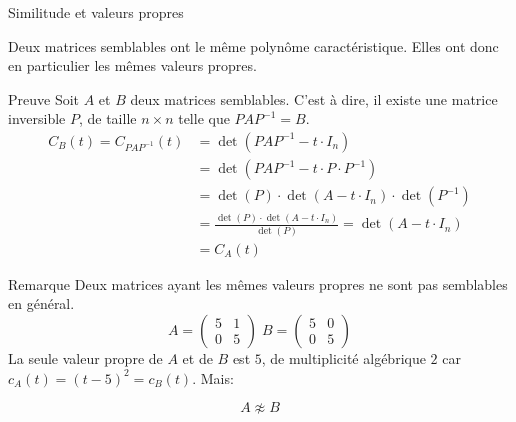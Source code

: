 \begin{parag}{Similitude et valeurs propres}
    \begin{theoreme}
        Deux matrices semblables ont le même polynôme caractéristique. Elles ont donc en particulier les mêmes valeurs propres.
    \end{theoreme}
    \begin{subparag}{Preuve}
        Soit $A$ et $B$ deux matrices semblables. C'est à dire, il existe une matrice inversible $P$, de taille $n \times n$ telle que $PAP^{-1} = B$.\\
        \begin{align*}
            C_B(t) = C_{PAP^{-1}}(t) &= \det (PAP^{-1} - t\cdot I_n)\\
            &= \det (PAP^{-1} - t\cdot P\cdot P^{-1})\\
            &= \det(P) \cdot \det(A - t\cdot I_n) \cdot \det(P^{-1})\\
            &= \frac{\det(P) \cdot \det(A-t\cdot I_n)}{\det(P)} = \det(A - t\cdot I_n)\\
            &= C_A(t)
        \end{align*}
    \end{subparag}

    \begin{subparag}{Remarque}
        Deux matrices ayant les mêmes valeurs propres ne sont pas semblables en général.
        \[A = \begin{pmatrix}
            5 & 1 \\ 0 & 5
        \end{pmatrix} \; B = \begin{pmatrix}
            5 & 0 \\ 0 & 5
        \end{pmatrix}\]
        La seule valeur propre de $A$ et de $B$ est $5$, de multiplicité algébrique $2$ car $c_A(t) = (t-5)^2 = c_B(t)$. Mais:
        \begin{formule}
            \[ A \not\approx B\]
        \end{formule}
    \end{subparag}
\end{parag}




